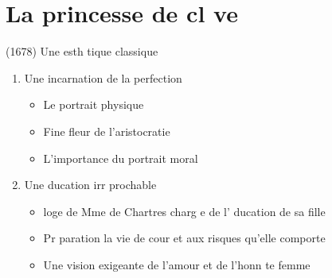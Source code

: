 \documentclass{article}
\begin{document}
\section*{La princesse de cl ve}
	(1678) Une esth tique classique
\begin{enumerate}
   \item Une incarnation de la perfection
   \begin{itemize}
     \item Le portrait physique
     \item Fine fleur de l'aristocratie
     \item L'importance du portrait moral
   \end{itemize}
   \item Une  ducation irr prochable
   \begin{itemize}
       \item  loge de Mme de Chartres charg e de l' ducation de sa fille
       \item Pr paration   la vie de cour et aux risques qu'elle comporte
       \item Une vision exigeante de l'amour et de l'honn te femme
    \end{itemize}
\end{enumerate}
\end{document}
